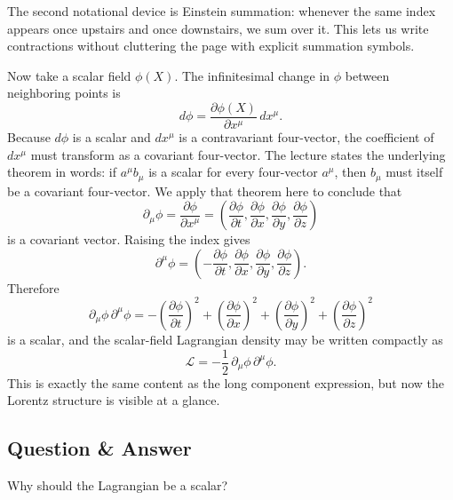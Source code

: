 The second notational device is Einstein summation: whenever the same index appears once upstairs and once downstairs, we sum over it. This lets us write contractions without cluttering the page with explicit summation symbols.

Now take a scalar field \(\phi(X)\). The infinitesimal change in \(\phi\) between neighboring points is
\begin{equation}
d\phi=\frac{\partial\phi(X)}{\partial x^\mu}\,dx^\mu.
\end{equation}
Because \(d\phi\) is a scalar and \(dx^\mu\) is a contravariant four-vector, the coefficient of \(dx^\mu\) must transform as a covariant four-vector. The lecture states the underlying theorem in words: if \(a^\mu b_\mu\) is a scalar for every four-vector \(a^\mu\), then \(b_\mu\) must itself be a covariant four-vector. We apply that theorem here to conclude that
\begin{equation}
\partial_\mu\phi=\frac{\partial\phi}{\partial x^\mu}
=
\left(
\frac{\partial\phi}{\partial t},
\frac{\partial\phi}{\partial x},
\frac{\partial\phi}{\partial y},
\frac{\partial\phi}{\partial z}
\right)
\end{equation}
is a covariant vector. Raising the index gives
\begin{equation}
\partial^\mu\phi
=
\left(
-\frac{\partial\phi}{\partial t},
\frac{\partial\phi}{\partial x},
\frac{\partial\phi}{\partial y},
\frac{\partial\phi}{\partial z}
\right).
\end{equation}
Therefore
\begin{equation}
\partial_\mu\phi\,\partial^\mu\phi
=
-\left(\frac{\partial\phi}{\partial t}\right)^2
+\left(\frac{\partial\phi}{\partial x}\right)^2
+\left(\frac{\partial\phi}{\partial y}\right)^2
+\left(\frac{\partial\phi}{\partial z}\right)^2
\end{equation}
is a scalar, and the scalar-field Lagrangian density may be written compactly as
\begin{equation}
\mathcal L=-\frac12\,\partial_\mu\phi\,\partial^\mu\phi.
\end{equation}
This is exactly the same content as the long component expression, but now the Lorentz structure is visible at a glance.

\subsection{Question \& Answer}

Why should the Lagrangian be a scalar?

